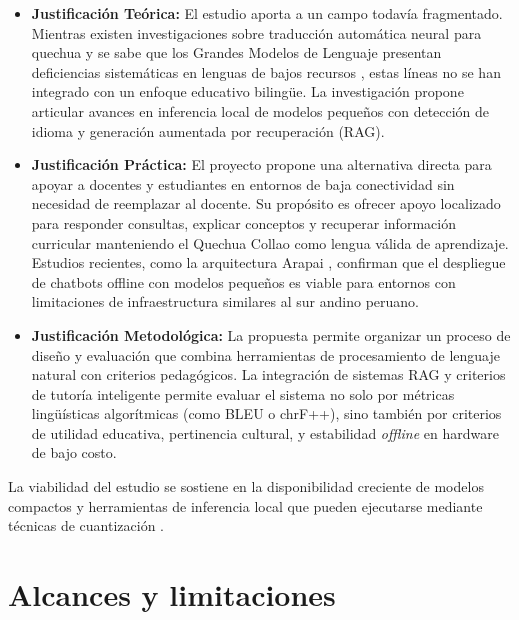 \begin{itemize}
	\item \textbf{Justificación Teórica:} El estudio aporta a un campo todavía fragmentado. Mientras existen investigaciones sobre traducción automática neural para quechua \citep{SullaTorres2024, Orcotoma2025} y se sabe que los Grandes Modelos de Lenguaje presentan deficiencias sistemáticas en lenguas de bajos recursos \citep{Court2024}, estas líneas no se han integrado con un enfoque educativo bilingüe. La investigación propone articular avances en inferencia local de modelos pequeños \citep{Xu2024} con detección de idioma y generación aumentada por recuperación (RAG).

	\item \textbf{Justificación Práctica:} El proyecto propone una alternativa directa para apoyar a docentes y estudiantes en entornos de baja conectividad sin necesidad de reemplazar al docente. Su propósito es ofrecer apoyo localizado para responder consultas, explicar conceptos y recuperar información curricular manteniendo el Quechua Collao como lengua válida de aprendizaje. Estudios recientes, como la arquitectura Arapai \citep{Walusimbi2026}, confirman que el despliegue de chatbots offline con modelos pequeños es viable para entornos con limitaciones de infraestructura similares al sur andino peruano.

	\item \textbf{Justificación Metodológica:} La propuesta permite organizar un proceso de diseño y evaluación que combina herramientas de procesamiento de lenguaje natural con criterios pedagógicos. La integración de sistemas RAG \citep{Li2025} y criterios de tutoría inteligente \citep{Levonian2025} permite evaluar el sistema no solo por métricas lingüísticas algorítmicas (como BLEU o chrF++), sino también por criterios de utilidad educativa, pertinencia cultural, y estabilidad \textit{offline} en hardware de bajo costo.
\end{itemize}

La viabilidad del estudio se sostiene en la disponibilidad creciente de modelos compactos y herramientas de inferencia local que pueden ejecutarse mediante técnicas de cuantización \citep{Xu2024}.

\section{Alcances y limitaciones}
